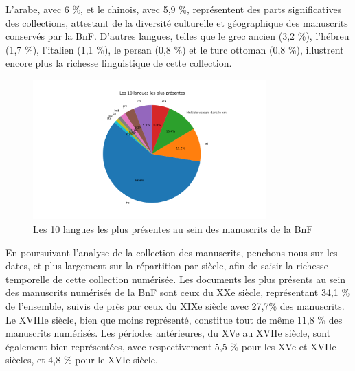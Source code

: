 \documentclass[a4paper,12pt,twoside]{book}
\begin{document}
	L’arabe, avec 6 \%, et le chinois, avec 5,9 \%, représentent des parts significatives des collections, attestant de la diversité culturelle et géographique des manuscrits conservés par la BnF. D’autres langues, telles que le grec ancien (3,2 \%), l’hébreu (1,7 \%), l’italien (1,1 \%), le persan (0,8 \%) et le turc ottoman (0,8 \%), illustrent encore plus la richesse linguistique de cette collection.
	\\
	\begin{figure}[h!]
		\centering
		\includegraphics[width=0.8\textwidth]{images/langue_mss.png}
		\caption{Les 10 langues les plus présentes au sein des manuscrits de la BnF}
		\label{fig:monimage}
	\end{figure}
	En poursuivant l’analyse de la collection des manuscrits, penchons-nous sur les dates, et plus largement sur la répartition par siècle, afin de saisir la richesse temporelle de cette collection numérisée.
	Les documents les plus présents au sein des manuscrits numérisés de la BnF sont ceux du XXe siècle, représentant 34,1 \% de l’ensemble, suivis de près par ceux du XIXe siècle avec 27,7\% des manuscrits. Le XVIIIe siècle, bien que moins représenté, constitue tout de même 11,8 \% des manuscrits numérisés. Les périodes antérieures, du XVe au XVIIe siècle, sont également bien représentées, avec respectivement 5,5 \% pour les XVe et XVIIe siècles, et 4,8 \% pour le XVIe siècle.
	
\end{document}
